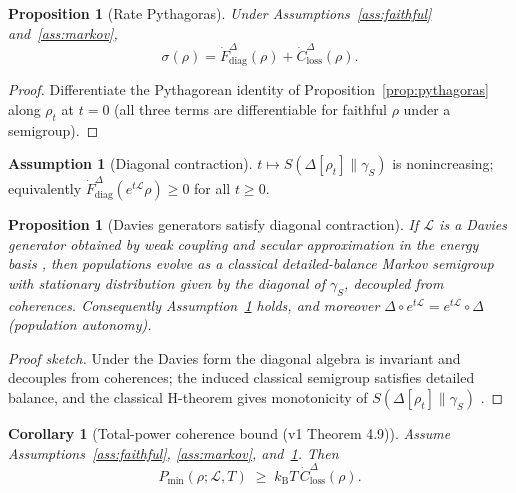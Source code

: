 \documentclass[11pt,a4paper]{article}
\theoremstyle{plain}
\newtheorem{proposition}[theorem]{Proposition}
\newtheorem{corollary}[theorem]{Corollary}
\theoremstyle{definition}
\newtheorem{assumption}[theorem]{Assumption}
\theoremstyle{remark}
\newcommand{\kB}{k_{\mathrm{B}}}
\newcommand{\Pmin}{P_{\min}}
\newcommand{\Closs}{\dot{C}^{\Delta}_{\mathrm{loss}}}
\newcommand{\Fdiag}{\dot{F}^{\Delta}_{\mathrm{diag}}}
\begin{document}
\begin{proposition}[Rate Pythagoras]\label{prop:ratesplit}
Under Assumptions~\ref{ass:faithful} and~\ref{ass:markov},
\begin{equation}
\sigma(\rho) = \Fdiag(\rho) + \Closs(\rho).
\end{equation}
\end{proposition}

\begin{proof}
Differentiate the Pythagorean identity of Proposition~\ref{prop:pythagoras}
along $\rho_t$ at $t = 0$ (all three terms are differentiable for faithful
$\rho$ under a semigroup).
\end{proof}

\begin{assumption}[Diagonal contraction]\label{ass:diagcontr}
$t \mapsto S(\Delta[\rho_t]\|\gamma_S)$ is nonincreasing; equivalently
$\Fdiag(e^{t\mathcal{L}}\rho) \ge 0$ for all $t \ge 0$.
\end{assumption}

\begin{proposition}[Davies generators satisfy diagonal contraction]
\label{prop:davies}
If $\mathcal{L}$ is a Davies generator obtained by weak coupling and secular
approximation in the energy basis \cite{Davies74}, then populations evolve as a
classical detailed-balance Markov semigroup with stationary distribution given
by the diagonal of $\gamma_S$, decoupled from coherences. Consequently
Assumption~\ref{ass:diagcontr} holds, and moreover
$\Delta \circ e^{t\mathcal{L}} = e^{t\mathcal{L}} \circ \Delta$
(\emph{population autonomy}).
\end{proposition}

\begin{proof}[Proof sketch]
Under the Davies form the diagonal algebra is invariant and decouples from
coherences; the induced classical semigroup satisfies detailed balance, and the
classical H-theorem gives monotonicity of $S(\Delta[\rho_t]\|\gamma_S)$
\cite{Davies74,Spohn78}.
\end{proof}

\begin{corollary}[Total-power coherence bound (v1 Theorem 4.9)]
\label{cor:totalpower}
Assume Assumptions~\ref{ass:faithful}, \ref{ass:markov},
and~\ref{ass:diagcontr}. Then
\begin{equation}
\Pmin(\rho; \mathcal{L}, T) \;\ge\; \kB T\, \Closs(\rho).
\end{equation}
\end{corollary}
\end{document}
